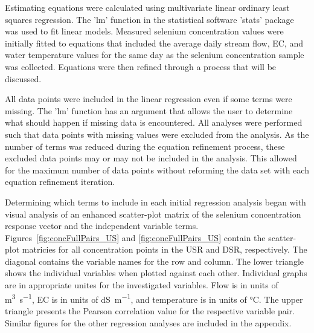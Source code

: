 Estimating equations were calculated using multivariate linear ordinary least squares regression.  The 'lm' function in the statistical software 'stats' package was used to fit linear models.   Measured selenium concentration values were initially fitted to equations that included the average daily stream flow, EC, and water temperature values for the same day as the selenium concentration sample was collected.  Equations were then refined through a process that will be discussed.

All data points were included in the linear regression even if some terms were missing.  The 'lm' function has an argument that allows the user to determine what should happen if missing data is encountered.  All analyses were performed such that data points with missing values were excluded from the analysis.  As the number of terms was reduced during the equation refinement process, these excluded data points may or may not be included in the analysis.  This allowed for the maximum number of data points without reforming the data set with each equation refinement iteration.

Determining which terms to include in each initial regression analysis began with visual analysis of an enhanced scatter-plot matrix of the selenium concentration response vector and the independent variable terms.  Figures~\ref{fig:concFullPairs_US} and \ref{fig:concFullPairs_US} contain the scatter-plot matricies for all concentration points in the USR and DSR, respectively.  The diagonal contains the variable names for the row and column.  The lower triangle shows the individual variables when plotted against each other.  Individual graphs are in appropriate unites for the investigated variables.  Flow is in units of \si{\cubic\meter\per\second}, EC is in units of \si{\deci\siemens\per\meter}, and temperature is in units of \si{\degreeCelsius}.  The upper triangle presents the Pearson correlation value for the respective variable pair.  Similar figures for the other regression analyses are included in the appendix.

